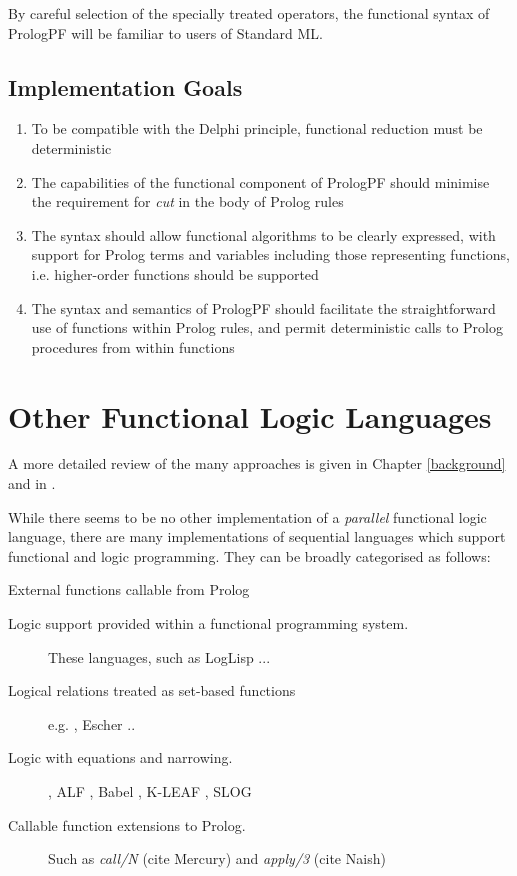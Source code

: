 By careful selection of the specially treated operators, the functional
syntax of PrologPF will be familiar to users of Standard ML.


\subsection{Implementation Goals}

\begin{enumerate}

\item{To  be compatible with the Delphi principle, functional reduction
  must be deterministic}
\item{The capabilities of the functional component of PrologPF should
  minimise the requirement for \textit{cut} in the body of Prolog
  rules}
\item{The syntax should allow functional algorithms to be clearly expressed,
  with support for Prolog terms and variables including those representing
  functions, i.e. higher-order functions should be supported}
\item{The syntax and semantics of PrologPF should facilitate the
  straightforward use of functions within Prolog rules, and permit
  deterministic calls to Prolog procedures from within functions}

\end{enumerate}

\section{Other Functional Logic Languages} %

A more detailed review of the many approaches is given
in Chapter \ref{background}
and in \cite{BL86, Han94}.

While there seems to be no other implementation of a \textit{parallel}
functional logic language, there are many implementations of sequential
languages which support functional and logic programming.
They can be
broadly categorised as follows:
\begin{description}
\item [External functions callable from Prolog] {
  \cite{BM88,MBB+93} }

\item [Logic support provided within a functional programming system.] {
  These languages, such as LogLisp \cite{RS82}...}

\item [Logical relations treated as set-based functions] {
  e.g. \cite{CSA87}, Escher \cite{Llo94}..}

\item [Logic with equations and narrowing.] {
  \cite{DvH87}, ALF \cite{Han92}, Babel \cite{MNRA92}, K-LEAF \cite{BCM88},
  SLOG \cite{Fri85} }

\item [Callable function extensions to Prolog.] {
  Such as \textit{call/N} (cite Mercury) and \textit{apply/3} (cite Naish)
  }

\end{description}

